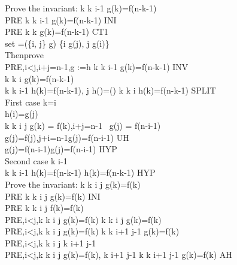 \documentclass[11pt,a4paper,fleqn]{article}
\begin{document}
\noindent
Prove the invariant: \forall k \cdot k  \upto i-1 \Rightarrow g(k)=f(n-k-1) \\
PRE \vdash [i:=0]\forall k \cdot k  \upto i-1 \Rightarrow g(k)=f(n-k-1) \;INI\\
PRE \vdash \forall k \cdot k   \Rightarrow g(k)=f(n-k-1) \;CT1 \\
set\; =(\{i, j\} \domsub g) \cup\{i \mapsto g(j), j \mapsto g(i)\} \\
Then\;prove \\
PRE,i<j,i+j=n-1,g :=h \vdash [i:=i+1,g:=h] \forall k \cdot k  \upto i-1 \Rightarrow g(k)=f(n-k-1) \;INV \\
\noindent
[g:=h]\forall k \cdot k  \upto i \Rightarrow g(k)=f(n-k-1) \\
\forall k \cdot k  \upto i-1 \Rightarrow h(k)=f(n-k-1),\forall {} \cdot {} \in {} \upto j \Rightarrow h()=() \vdash \forall k \cdot k  \upto i \Rightarrow h(k)=f(n-k-1) \;SPLIT \\
First \;case\; k=i \\
h(i)=g(j) \\
\forall k \cdot k \in i \upto j \Rightarrow g(k) = f(k),i+j=n-1 \vdash \ g(j) = f(n-i-1) \\
g(j)=f(j),j+i=n-1\vdash g(j)=f(n-i-1) \;UH \\
g(j)=f(n-i-1)\vdash g(j)=f(n-i-1) \; HYP \\
Second \; case \; k  \upto i-1 \\
\forall k \cdot k  \upto i-1 \Rightarrow h(k)=f(n-k-1) \vdash h(k)=f(n-k-1) \;HYP \\

\noindent
Prove the invariant: \forall k \cdot k \in i \upto j \Rightarrow g(k)=f(k) \\
PRE \vdash [g:=f]\forall k \cdot k \in i \upto j \Rightarrow g(k)=f(k) \;INI \\
PRE \vdash \forall k \cdot k \in i \upto j \Rightarrow f(k)=f(k) \\
PRE,i<j,\forall k \cdot k \in i \upto j \Rightarrow g(k)=f(k) \vdash [i:=i+1,j:=j-1]\forall k \cdot k \in i \upto j \Rightarrow g(k)=f(k) \\
PRE,i<j,\forall k \cdot k \in i \upto j \Rightarrow g(k)=f(k) \vdash \forall k \cdot k \in i+1 \upto j-1 \Rightarrow g(k)=f(k) \\
PRE,i<j,\forall k \cdot k \in i \upto j \vdash k \in i+1 \upto j-1 \\
PRE,i<j,\forall k \cdot k \in i \upto j \Rightarrow g(k)=f(k), k \in i+1 \upto j-1 \vdash \forall k \cdot k \in i+1 \upto j-1 \Rightarrow g(k)=f(k) \;AH\\
\end{document}
